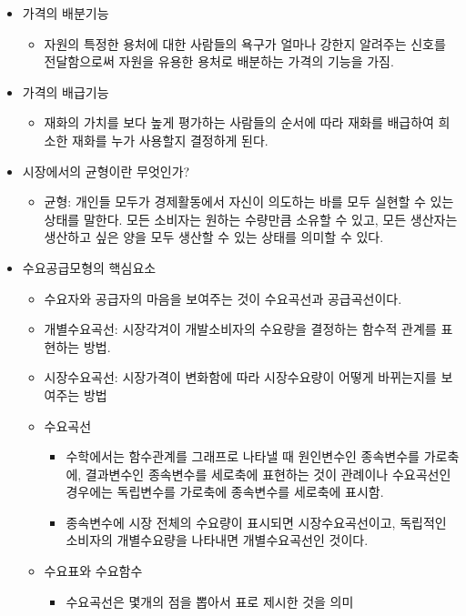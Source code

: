 \documentclass{report}
\begin{document}
\begin{itemize}
\begin{itemize}
    \end{itemize}
    \item 가격의 배분기능
    \begin{itemize}
        \item 자원의 특정한 용처에 대한 사람들의 욕구가 얼마나 강한지 알려주는 신호를 전달함으로써 자원을 유용한 용처로 배분하는 가격의 기능을 가짐.
    \end{itemize}
    \item 가격의 배급기능
    \begin{itemize}
        \item 재화의 가치를 보다 높게 평가하는 사람들의 순서에 따라 재화를 배급하여 희소한 재화를 누가 사용할지 결정하게 된다.
    \end{itemize}
    \item 시장에서의 균형이란 무엇인가?
    \begin{itemize}
        \item 균형: 개인들 모두가 경제활동에서 자신이 의도하는 바를 모두 실현할 수 있는 상태를 말한다. 모든 소비자는 원하는 수량만큼 소유할 수 있고, 모든 생산자는 생산하고 싶은 양을 모두 생산할 수 있는 상태를 의미할 수 있다.
    \end{itemize}
    \item 수요공급모형의 핵심요소
    \begin{itemize}
        \item 수요자와 공급자의 마음을 보여주는 것이 수요곡선과 공급곡선이다.
        \item 개별수요곡선: 시장각겨이 개발소비자의 수요량을 결정하는 함수적 관계를 표현하는 방법.
        \item 시장수요곡선: 시장가격이 변화함에 따라 시장수요량이 어떻게 바뀌는지를 보여주는 방법
        \item 수요곡선
        \begin{itemize}
            \item 수학에서는 함수관계를 그래프로 나타낼 때 원인변수인 종속변수를 가로축에, 결과변수인 종속변수를 세로축에 표현하는 것이 관례이나 수요곡선인 경우에는 독립변수를 가로축에 종속변수를 세로축에 표시함.
            \item 종속변수에 시장 전체의 수요량이 표시되면 시장수요곡선이고, 독립적인 소비자의 개별수요량을 나타내면 개별수요곡선인 것이다.
        \end{itemize}
        \item 수요표와 수요함수
        \begin{itemize}
            \item 수요곡선은 몇개의 점을 뽑아서 표로 제시한 것을 의미

\end{itemize}
\end{itemize}
\end{itemize}
\end{document}

